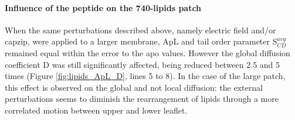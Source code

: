 \paragraph{Influence of the peptide on the 740-lipids patch} When the same perturbations described above, namely electric field and/or capzip, were applied to a larger membrane, ApL and tail order parameter S$^{avg}_{CD}$ remained equal within the error to the apo values. However the global diffusion coefficient D was still significantly affected, being reduced between 2.5 and 5 times (Figure \ref{fig:lipids_ApL_D}, lines 5 to 8).
%
In the case of the large patch, this effect is observed on the global and not local diffusion: the external perturbations seems to diminish the rearrangement of lipids through a more correlated motion between upper and lower leaflet.

